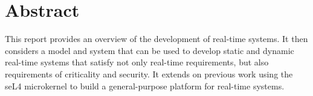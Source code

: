 \chapter*{Abstract}\label{abstract}

This report provides an overview of the development of real-time systems. It then considers a model
and system that can be used to develop static and dynamic real-time systems that satisfy not only
real-time requirements, but also requirements of criticality and security. It extends on previous
work using the seL4 microkernel to build a general-purpose platform for real-time systems.
